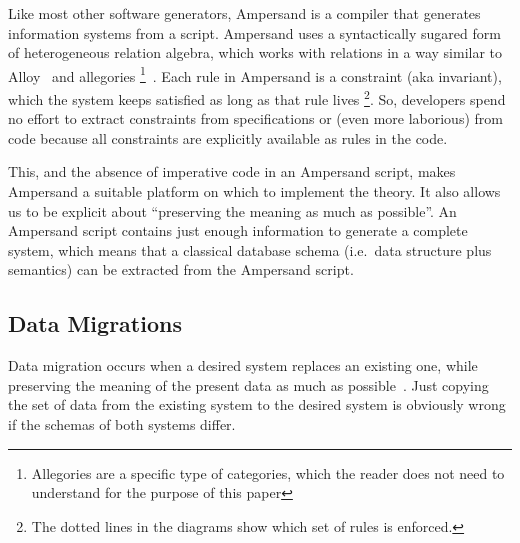 \documentclass{elsarticle}
\begin{document}
   Like most other software generators, Ampersand is a compiler that generates information systems from a script.
   Ampersand uses a syntactically sugared form of heterogeneous relation algebra,
   which works with relations in a way similar to Alloy~\cite{Alloy2006} and allegories%
\footnote{Allegories are a specific type of categories, which the reader does not need to understand for the purpose of this paper}~\cite{Zielinski2013}.
   Each rule in Ampersand is a constraint (aka invariant), which the system keeps satisfied as long as that rule lives%
\footnote{The dotted lines in the diagrams show which set of rules is enforced.}.
   So, developers spend no effort to extract constraints from specifications or (even more laborious) from code
   because all constraints are explicitly available as rules in the code.

   This, and the absence of imperative code in an Ampersand script, makes Ampersand a suitable platform on which to implement the theory.
   It also allows us to be explicit about ``preserving the meaning as much as possible''.
   An Ampersand script contains just enough information to generate a complete system,
   which means that a classical database schema (i.e.\ data structure plus semantics) can be extracted from the Ampersand script.

\subsection{Data Migrations}
   Data migration occurs when a desired system replaces an existing one,
   while preserving the meaning of the present data as much as possible~\cite{Spivak2012}.
   Just copying the set of data from the existing system to the desired system is obviously wrong if the schemas of both systems differ.
\end{document}

